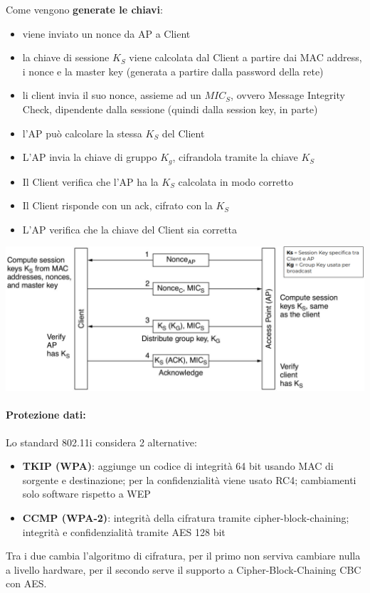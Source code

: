 Come vengono \textbf{generate le chiavi}:
\begin{itemize}
	\item viene inviato un nonce da AP a Client
	\item la chiave di sessione $K_S$ viene calcolata dal Client a partire dai MAC address, i nonce e la master key (generata a partire dalla password della rete)
	\item li client invia il suo nonce, assieme ad un $MIC_S$, ovvero Message Integrity Check, dipendente dalla sessione (quindi dalla session key, in parte)
	\item l'AP può calcolare la stessa $K_S$ del Client
	\item L'AP invia la chiave di gruppo $K_g$, cifrandola tramite la chiave $K_S$
	\item Il Client verifica che l'AP ha la $K_S$ calcolata in modo corretto
	\item Il Client risponde con un ack, cifrato con la $K_S$
	\item L'AP verifica che la chiave del Client sia corretta
\end{itemize}
\begin{center}
	\includegraphics[width=0.95\linewidth]{img/wlan/keygen}
\end{center}

\newpage

\paragraph{Protezione dati:} Lo standard 802.11i considera 2 alternative: 
\begin{itemize}
	\item \textbf{TKIP (WPA)}: aggiunge un codice di integrità 64 bit usando MAC di sorgente e destinazione; per la confidenzialità viene usato RC4; cambiamenti solo software rispetto a WEP
	\item \textbf{CCMP (WPA-2)}: integrità della cifratura tramite cipher-block-chaining; integrità e confidenzialità tramite AES 128 bit
\end{itemize}
Tra i due cambia l'algoritmo di cifratura, per il primo non serviva cambiare nulla a livello hardware, per il secondo serve il supporto a Cipher-Block-Chaining CBC con AES.\\

